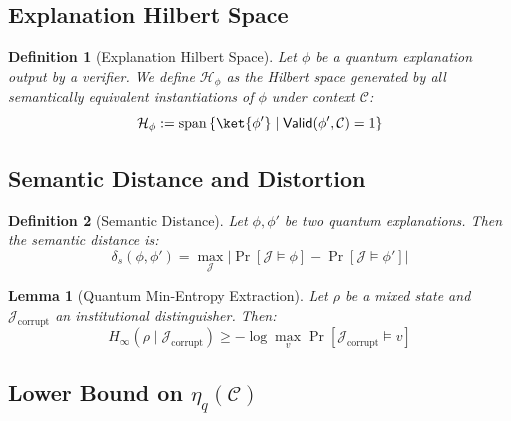 \documentclass[preprint,12pt]{elsarticle}
\newtheorem{definition}{Definition}[section]
\newtheorem{lemma}{Lemma}[section]
\begin{document}
        \subsection{Explanation Hilbert Space}

            \begin{definition}[Explanation Hilbert Space]\label{def:explanation_hilbert_space} 
                Let $\phi$ be a quantum explanation output by a verifier. We define $\mathcal{H}_\phi$ as the Hilbert space generated by all semantically equivalent instantiations of $\phi$ under context $\mathcal{C}$:
                \begin{equation}\label{eq:explanation_hilbert_space} 
                    \mathcal{H}_\phi := \mathrm{span} \left\{ \ket{\phi'} \mid \mathsf{Valid}(\phi', \mathcal{C}) = 1 \right\}
                \end{equation}
            \end{definition}

        \subsection{Semantic Distance and Distortion}

            \begin{definition}[Semantic Distance] \label{def:semantic_distance} 
                Let $\phi, \phi'$ be two quantum explanations. Then the semantic distance is:
                \begin{equation}\label{eq:semantic_distance} 
                    \delta_s(\phi, \phi') = \max_{\mathcal{J}} \left| \Pr[\mathcal{J} \models \phi] - \Pr[\mathcal{J} \models \phi'] \right|
                \end{equation}
            \end{definition}

            \begin{lemma}[Quantum Min-Entropy Extraction]\label{lem:min_entropy_extraction} 
                Let $\rho$ be a mixed state and $\mathcal{J}_{\text{corrupt}}$ an institutional distinguisher. Then:
                \begin{equation}\label{eq:min_entropy_extraction} 
                    H_\infty(\rho \mid \mathcal{J}_{\text{corrupt}}) \geq -\log \max_v \Pr[\mathcal{J}_{\text{corrupt}} \models v]
                \end{equation}
            \end{lemma}

        \subsection{Lower Bound on $\eta_q(\mathcal{C})$}
\end{document}
